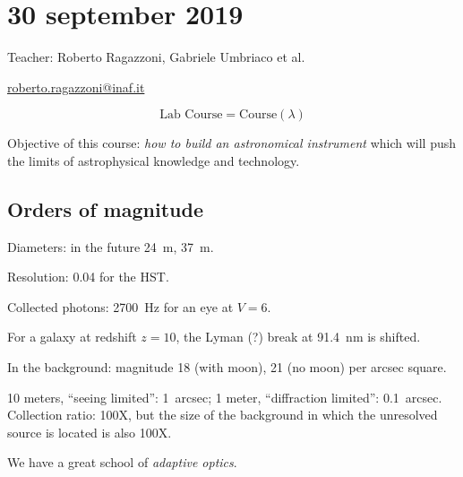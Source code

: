 \documentclass[main.tex]{subfiles}
\begin{document}
\section*{30 september 2019}

Teacher: Roberto Ragazzoni, Gabriele Umbriaco et al.

\url{roberto.ragazzoni@inaf.it}

\begin{equation}
    \text{Lab Course} = \text{Course} (\lambda)
\end{equation}

Objective of this course: \emph{how to build an astronomical instrument} which will push the limits of astrophysical knowledge and technology.

\subsection{Orders of magnitude}

Diameters: in the future \SI{24}{m}, \SI{37}{m}.

Resolution: \SI{0.04}{\arcsec} for the HST.

Collected photons: \SI{2700}{Hz} for an eye at \(V=6\).

For a galaxy at redshift \(z=10\), the Lyman (?) break at \SI{91.4}{nm} is shifted.

In the background: magnitude 18 (with moon), 21 (no moon) per arcsec square.

10 meters, ``seeing limited'': \SI{1}{arcsec}; 1 meter, ``diffraction limited'': \SI{0.1}{arcsec}. Collection ratio: 100X, but the size of the background in which the unresolved source is located is also 100X.

We have a great school of \emph{adaptive optics}.
\end{document}

